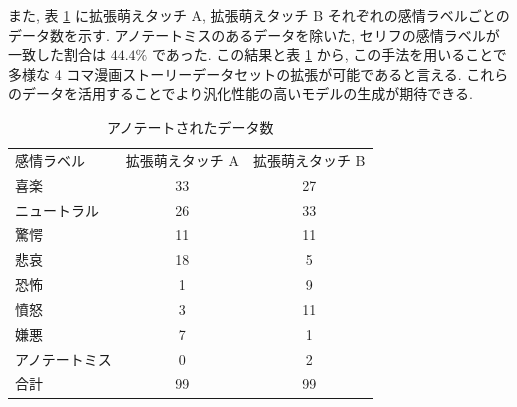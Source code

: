 \begin{table}[!h]
\vspace{5mm}
\caption{アノテートされたセリフと感情ラベルの例}
\label{table:aug_data}
\centering
{}
\vspace{1mm}
\end{table}

\newpage
また, 表 \ref{table:data_moe_aug} に拡張萌えタッチ A, 拡張萌えタッチ B それぞれの感情ラベルごとのデータ数を示す. アノテートミスのあるデータを除いた, セリフの感情ラベルが一致した割合は $44.4 \%$ であった. この結果と表 \ref{table:data_moe_aug} から, この手法を用いることで多様な 4 コマ漫画ストーリーデータセットの拡張が可能であると言える. これらのデータを活用することでより汎化性能の高いモデルの生成が期待できる.


\begin{table}[!h]
\vspace{20mm}
\begin{center}
\caption{アノテートされたデータ数} %
\label{table:data_moe_aug} %
\begin{tabular}{lcc}
\hline
\multirow{2}{*}{感情ラベル} & \multirow{2}{*}{拡張萌えタッチ A} & \multirow{2}{*}{拡張萌えタッチ B} \\
 &  &  \\ \hline
喜楽 & 33 & 27 \\ \hline
ニュートラル & 26 & 33 \\
驚愕 & 11 & 11 \\
悲哀 & 18 & 5 \\
恐怖 & 1 & 9 \\
憤怒 & 3 & 11 \\
嫌悪 & 7 & 1 \\ \hline
アノテートミス & 0 & 2 \\ \hline
合計 & 99 & 99
\end{tabular}
\end{center}
\vspace{10mm}
\end{table}

